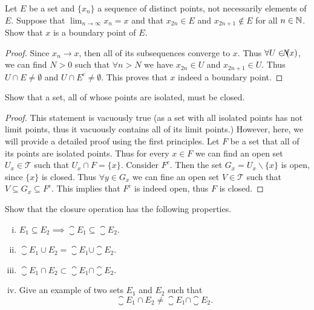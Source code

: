 \begin{problem}
	Let $E$ be a set and $\{x_n\}$ a sequence of distinct points, not necessarily elements of $E$. Suppose that $\lim_{n\to\infty}x_n = x$ and that $x_{2n} \in E$ and $x_{2n+1} \notin E$ for all $n\in\mathbb{N}$. Show that $x$ is a boundary point of $E$.
\end{problem}
\begin{proof}
	Since $x_n \to x$, then all of its subsequences converge to $x$. Thus $\forall U \in \mathclap{N}(x)$, we can find $N>0$ such that $\forall n>N$ we have $x_{2n} \in U$ and $x_{2n+1} \in U$. Thus $U \cap E \neq \emptyset$ and $U \cap E^c \neq \emptyset$. This proves that $x$ indeed a boundary point.
\end{proof}
\begin{problem}
	Show that a set, all of whose points are isolated, must be closed.
\end{problem}
\begin{proof}
	This statement is vacuously true (as a set with all isolated points has not limit points, thus it vacuously contains all of its limit points.) However, here, we will provide a detailed proof using the first principles. Let $F$ be a set that all of its points are isolated points. Thus for every $x \in F$ we can find an open set $U_x \in \mathcal{T}$ such that $U_x \cap F = \{x\}$. Consider $F^c$. Then the set $G_x = U_x \backslash \{x\}$ is open, since $\{x\}$ is closed. Thus $\forall y \in G_x$ we can fine an open set $V \in \mathcal{T}$ such that $V \subseteq G_x \subseteq F^c$. This implies that $F^c$ is indeed open, thus $F$ is closed. 
\end{proof}

\begin{problem}
	Show that the closure operation has the following properties.
	\begin{enumerate}[(i)]
		\item $E_1 \subseteq E_2 \implies \closure{E_1} \subseteq \closure{E_2}$.
		\item $\closure{E_1 \cup E_2} = \closure{E_1} \cup \closure{E_2}$.
		\item $\closure{E_1 \cap E_2} \subset \closure{E_1} \cap \closure{E_2}$.
		\item Give an example of two sets $E_1$ and $E_2$ such that 
		\[ \closure{E_1 \cap E_2} \neq \closure{E_1} \cap \closure{E_2}. \]
	\end{enumerate}
\end{problem}

